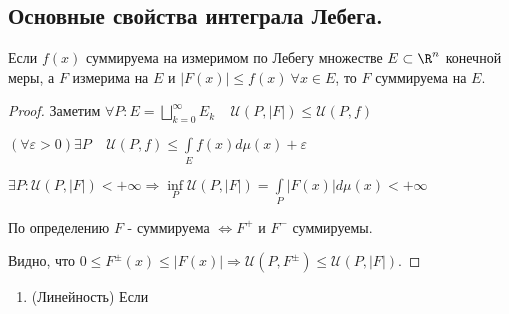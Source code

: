 \subsection{Основные свойства интеграла Лебега.}
\begin{lemma}
Если $f(x)$ суммируема на измеримом по Лебегу множестве $E \subset \R^n$ конечной меры, а $F$ измерима на $E$ и $|F(x)| \leqslant f(x)\ \forall x \in E$, то $F$ суммируема на $E$.
\end{lemma}
\begin{proof}
Заметим $\forall P: E = \bigsqcup\limits_{k=0}^{\infty}E_k\ \ \ \ \ \mathcal{U}(P, |F|) \leqslant \mathcal{U}(P, f)$

$(\forall \varepsilon > 0) \exists P\ \ \ \ \  \mathcal{U}(P,f) \leqslant \int\limits_E f(x)d\mu(x)+\varepsilon$

$\exists P: \mathcal{U}(P, |F|) < +\infty \Rightarrow \inf\limits_P \mathcal{U}(P, |F|) = \int\limits_P |F(x)|d\mu(x)<+\infty$

По определению $F$ - суммируема $\Leftrightarrow F^+ \text{ и } F^-$ суммируемы. 

Видно, что $0\leqslant F^\pm(x) \leqslant |F(x)| \Rightarrow \mathcal{U} (P,F^\pm) \leqslant \mathcal{U}(P,|F|)$.
\end{proof}


\begin{theorem}

\begin{enumerate}
\item(Линейность) Если
\end{enumerate}
\end{theorem}